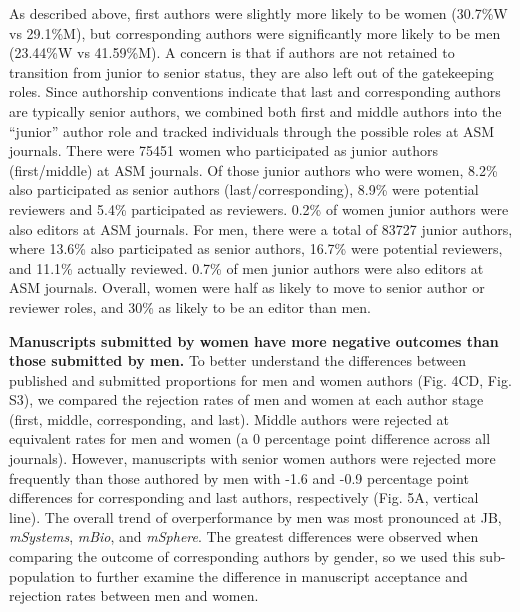 \documentclass[11pt,]{article}
\begin{document}
As described above, first authors were slightly more likely to be women
(30.7\%W vs 29.1\%M), but corresponding authors were significantly more
likely to be men (23.44\%W vs 41.59\%M). A concern is that if authors
are not retained to transition from junior to senior status, they are
also left out of the gatekeeping roles. Since authorship conventions
indicate that last and corresponding authors are typically senior
authors, we combined both first and middle authors into the ``junior''
author role and tracked individuals through the possible roles at ASM
journals. There were 75451 women who participated as junior authors
(first/middle) at ASM journals. Of those junior authors who were women,
8.2\% also participated as senior authors (last/corresponding), 8.9\%
were potential reviewers and 5.4\% participated as reviewers. 0.2\% of
women junior authors were also editors at ASM journals. For men, there
were a total of 83727 junior authors, where 13.6\% also participated as
senior authors, 16.7\% were potential reviewers, and 11.1\% actually
reviewed. 0.7\% of men junior authors were also editors at ASM journals.
Overall, women were half as likely to move to senior author or reviewer
roles, and 30\% as likely to be an editor than men.

\textbf{Manuscripts submitted by women have more negative outcomes than
those submitted by men.} To better understand the differences between
published and submitted proportions for men and women authors (Fig. 4CD,
Fig. S3), we compared the rejection rates of men and women at each
author stage (first, middle, corresponding, and last). Middle authors
were rejected at equivalent rates for men and women (a 0 percentage
point difference across all journals). However, manuscripts with senior
women authors were rejected more frequently than those authored by men
with -1.6 and -0.9 percentage point differences for corresponding and
last authors, respectively (Fig. 5A, vertical line). The overall trend
of overperformance by men was most pronounced at JB, \emph{mSystems},
\emph{mBio}, and \emph{mSphere}. The greatest differences were observed
when comparing the outcome of corresponding authors by gender, so we
used this sub-population to further examine the difference in manuscript
acceptance and rejection rates between men and women.
\end{document}
